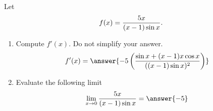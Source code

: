 \documentclass{ximera}
\begin{document}
\begin{exercise}


Let 
\[
f(x)=\frac{5x}{(x-1)\sin x}\ldotp
\]
\begin{enumerate}[label=\bf{(\alph*)},align=left]
\item Compute $f'(x)$. Do not simplify your answer. \[f'(x)=\answer{-5\left(\frac{\sin x+(x-1)x\cos x}{((x-1)\sin x)^2}\right)}\]
\item Evaluate the following limit \[\lim_{x\to 0}\frac{5x}{(x-1)\sin x}=\answer{-5}\]
\end{enumerate}





\end{exercise}
\end{document}
